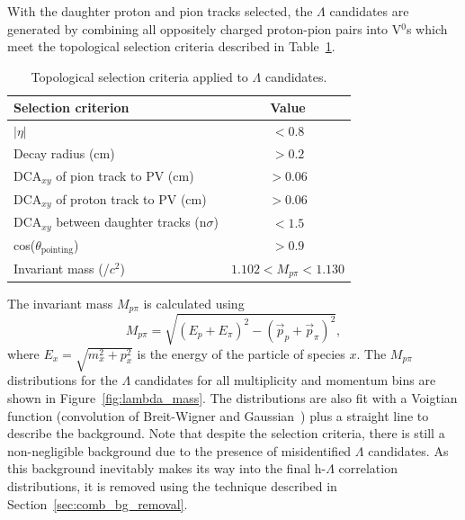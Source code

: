 With the daughter proton and pion tracks selected, the $\Lambda$ candidates are generated by combining all oppositely charged proton-pion pairs into V$^0$s which meet the topological selection criteria described in Table~\ref{tab:lambda_selection}. 

\begin{table}[h!]
	\centering
	\caption{Topological selection criteria applied to $\Lambda$ candidates.}
	\label{tab:lambda_selection}
	\begin{tabular}{l c}
		\hline
		Selection criterion & Value \\
		\hline
		$|\eta|$ & $< 0.8$ \\
		Decay radius (cm) & $> 0.2$ \\
		DCA$_{xy}$ of pion track to PV (cm) & $> 0.06$ \\
		DCA$_{xy}$ of proton track to PV (cm) & $> 0.06$ \\
		DCA$_{xy}$ between daughter tracks (n$\sigma$) & $< 1.5$ \\
		cos($\theta_{\text{pointing}}$) & $> 0.9$ \\
		Invariant mass (\GeV/$c^2$) & $1.102 < M_{p\pi} < 1.130$ \\
		\hline
	\end{tabular}
\end{table}

\noindent The invariant mass $M_{p\pi}$ is calculated using
%
\begin{equation}
	M_{p\pi} = \sqrt{(E_{p} + E_{\pi})^2 - (\vec{p}_{p} + \vec{p}_{\pi})^2},
\end{equation}
%
where $E_{x} = \sqrt{m_{x}^2 + p_{x}^2}$ is the energy of the particle of species $x$. The $M_{p\pi}$ distributions for the $\Lambda$ candidates for all multiplicity and momentum bins are shown in Figure~\ref{fig:lambda_mass}. The distributions are also fit with a Voigtian function (convolution of Breit-Wigner and Gaussian~\cite{Voigt}) plus a straight line to describe the background. Note that despite the selection criteria, there is still a non-negligible background due to the presence of misidentified $\Lambda$ candidates. As this background inevitably makes its way into the final h-$\Lambda$ correlation distributions, it is removed using the technique described in Section~\ref{sec:comb_bg_removal}. 


